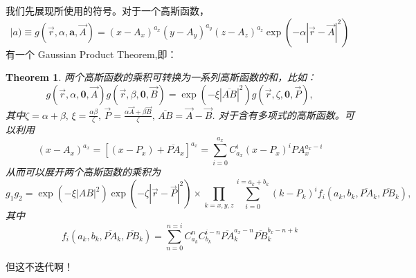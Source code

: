 \documentclass[12pt,a4paper,openany,twoside]{book}
\newtheorem{theorem}{Theorem}[section]
\numberwithin{equation}{section}
\begin{document}
          我们先展现所使用的符号。对于一个高斯函数，
          \begin{equation}
              |a) \equiv g(\vec{r},\alpha,\boldsymbol{a},\vec{A}) = (x- A_x)^{a_x} (y-A_y)^{a_y} (z-A_z)^{a_z} \exp \left(-\alpha |\vec{r} - \vec{A}|^2\right)
          \end{equation}
          有一个 Gaussian Product Theorem,即\cite{may2006density}：
          \begin{theorem}
              两个高斯函数的乘积可转换为一系列高斯函数的和，比如：
              \begin{equation}
                  g(\vec{r},\alpha, \boldsymbol{0},\vec{A})g(\vec{r},\beta, \boldsymbol{0},\vec{B}) = \exp(-\xi |\overline{AB}|^2) g(\vec{r},\zeta,\boldsymbol{0},\vec{P}),
              \end{equation}
              其中$\zeta = \alpha + \beta, \, \xi = \frac{\alpha\beta}{\zeta}, \, \vec{P} = \frac{\alpha \vec{A} + \beta \vec{B}}{\zeta}, \, \overline{AB} = \vec{A} - \vec{B}$.
              对于含有多项式的高斯函数。可以利用
              \begin{equation}
                  (x- A_x) ^{a_x} = [(x-P_x) + \overline{PA}_x]^{a_x} = \sum_{i=0}^{a_x} C_{a_x}^i (x-P_x)^i {PA}_x^{a_x - i}
              \end{equation}
              从而可以展开两个高斯函数的乘积为
              \begin{equation}
                  g_1g_2 = \exp(-\xi|AB|^2) \exp(-\zeta|\vec{r} - \vec{P}|^2) \times \prod_{k=x,y,z} \sum_{i=0}^{i=a_k+b_k}(k-P_k)^i f_i (a_k,b_k,\overline{PA}_k,\overline{PB}_k),
              \end{equation}
              其中
              \begin{equation}
                  f_i(a_k,b_k,\overline{PA}_k,\overline{PB}_k) = \sum_{n=0}^{n=i} C_{a_k}^{n} C_{b_k}^{i-n} \overline{PA}_k^{a_x-n}\overline{PB}_k^{b_x-n+k}
              \end{equation}
          \end{theorem}
          但这不迭代啊！
          
\end{document}
